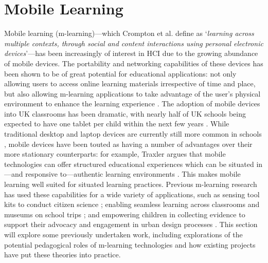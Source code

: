 \section{Mobile Learning}
Mobile learning (m-learning)—which Crompton et al. define as `\textit{learning across multiple contexts, through social and content interactions using personal electronic devices}'\citep{Crompton2013}—has been increasingly of interest in HCI due to the growing abundance of mobile devices. The portability and networking capabilities of these devices has been shown to be of great potential for educational applications: not only allowing users to access online learning materials irrespective of time and place, but also allowing m-learning applications to take advantage of the user’s physical environment to enhance the learning experience \citep{Frohberg2009}. The adoption of mobile devices into UK classrooms has been dramatic, with nearly half of UK schools being expected to have one tablet per child within the next few years \citep{BritishEducationalSuppliersAssociation2015}. While traditional desktop and laptop devices are currently still more common in schools \citep{BritishEducationalSuppliersAssociation2017}, mobile devices have been touted as having a number of advantages over their more stationary counterparts: for example, Traxler argues that mobile technologies can offer structured educational experiences which can be situated in---and responsive to---authentic learning environments \citep{Traxler2011}. This makes mobile learning well suited for situated learning practices. Previous m-learning research has used these capabilities for a wide variety of applications, such as sensing tool kits to conduct citizen science \citep{Sharples2017}; enabling seamless learning across classrooms and museums on school trips \citep{Vavoula2009}; and empowering children in collecting evidence to support their advocacy and engagement in urban design processes \citep{Peacock2018}. This section will explore some previously undertaken work, including explorations of the potential pedagogical roles of m-learning technologies and how existing projects have put these theories into practice.

